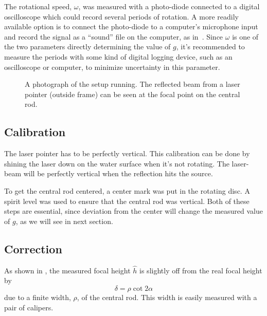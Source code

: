 \documentclass[11pt, a4paper, twocolumn, swedish, english]{article}
\begin{document}
The rotational speed, $\omega$, was measured with a photo-diode connected
to a digital oscilloscope which could record several periods of
rotation. A more readily available option is to connect the
photo-diode to a computer's microphone input and record the signal as a
``sound'' file on the computer, as in~\cite{Sabatka2010}. Since
$\omega$ is one of the two parameters directly determining the value
of $g$, it's recommended to measure the periods with some kind of
digital logging device, such as an oscilloscope or computer, to
minimize uncertainty in this parameter.

\begin{figure}
\centering
\resizebox{6cm}{!}{}
\caption{A photograph of the setup running. The
  reflected beam from a laser pointer (outside frame) can be seen at
  the focal point on the central rod. } 
\label{fig:rot_bowl_pic} 
\end{figure}

\subsection{Calibration}

The laser pointer has to be perfectly vertical. This calibration can be
done by shining the laser down on the water surface when it's not
rotating. The laser-beam will be perfectly vertical when the
reflection hits the source.

To get the central rod centered, a center mark was put in the rotating
disc. A spirit level was used to ensure that the central rod was
vertical. Both of these steps are essential, since deviation from the
center will change the measured value of $g$, as we will see in next
section. 


\subsection{Correction}\label{sec:corrections}

As shown in , the measured focal height
$\hat{h}$ is slightly off from the real focal height by 
\begin{equation}%
\delta=\rho\cot 2\alpha
\end{equation}
due to a finite width, $\rho$, of the central rod. This width is easily
measured with a pair of calipers.
\end{document}
